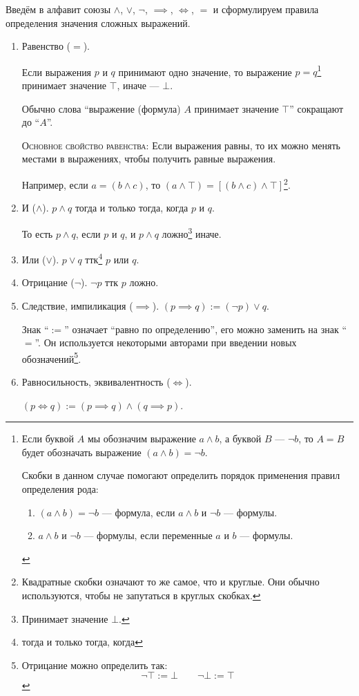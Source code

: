 Введём в алфавит союзы $\land$, $\lor$, $\lnot$, $\implies$, $\iff$, $=$
и сформулируем правила определения значения сложных выражений.
\begin{enumerate}
	\item{}Равенство ($=$).

	Если выражения $p$ и $q$ принимают одно значение,
	то выражение $p=q$\footnote[][-2cm]{
		Если буквой $A$ мы обозначим выражение $a\land b$,
		а буквой $B$ --- $\lnot b$, то $A=B$ будет обозначать выражение
		${(a\land b)=\lnot b}$.

		Скобки в данном случае помогают определить порядок
		применения правил определения рода:
		\begin{enumerate}
			\item{}${(a\land b)=\lnot b}$ --- формула,
			если $a\land b$ и $\lnot b$ --- формулы.
			\item{}$a\land b$ и $\lnot b$ --- формулы, если переменные $a$ и $b$ --- формулы.
		\end{enumerate}
	} принимает значение $\top$, иначе --- $\bot$.

	Обычно слова ``выражение (формула) $A$ принимает значение $\top$''
	сокращают до ``$A$''.

	\textsc{Основное свойство равенства:} Если выражения равны, то их можно менять
	местами в выражениях, чтобы получить равные выражения.

	Например, если $a=(b\land c)$, то $(a\land\top)=[(b\land c)\land\top]$\footnote{
		Квадратные скобки означают то же самое,
		что и круглые. Они обычно используются, чтобы не запутаться в круглых скобках.
	}.

	\item{}И ($\land$). $p\land q$ тогда и только тогда, когда $p$ и $q$.

	То есть $p\land q$, если $p$ и $q$,
	и $p\land q$ ложно\footnote{Принимает значение $\bot$.} иначе.

	\item{}Или ($\lor$). $p\lor q$ ттк\footnote{тогда и только тогда, когда} $p$ или $q$.

	\item{}Отрицание ($\lnot$). $\lnot p$ ттк $p$ ложно.

	\item{}Следствие, импиликация ($\implies$). $(p\implies q):=(\lnot p)\lor q$.

	Знак ``$:=$'' означает ``равно по определению'', его можно заменить
	на знак ``$=$''. Он используется некоторыми авторами при введении новых
	обозначений\footnote{
		Отрицание можно определить так:
		\[
			\lnot\top:=\bot\qquad \lnot\bot:=\top
		\]
	}.

	\item{}Равносильность, эквивалентность ($\iff$).

	$(p\iff q):=(p\implies q)\land (q\implies p)$.
\end{enumerate}

